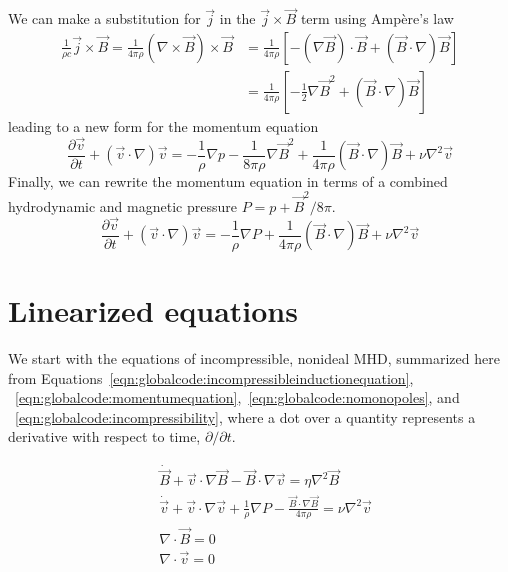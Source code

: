\documentclass[letterpaper]{article}
\begin{document}
We can make a substitution for $\vec{j}$ in the $\vec{j}\times\vec{B}$
term using Amp\`{e}re's law
\begin{align}
\frac{1}{\rho c}\vec{j}\times\vec{B} 
 = \frac{1}{4\pi \rho}\left(\nabla\times\vec{B}\right)\times\vec{B} 
 &= \frac{1}{4\pi \rho}\left[-\left(\nabla\vec{B}\right)\cdot\vec{B} 
                            +\left(\vec{B}\cdot\nabla\right)\vec{B}\right]
\nonumber \\
 &= \frac{1}{4\pi \rho}\left[-\frac{1}{2}\nabla\vec{B}^2 
                            +\left(\vec{B}\cdot\nabla\right)\vec{B}\right]
\end{align}
leading to a new form for the momentum equation
\begin{equation}
\frac{\partial \vec{v}}{\partial t} + \left(\vec{v}\cdot\nabla\right)\vec{v}
 = -\frac{1}{\rho}\nabla p - \frac{1}{8\pi\rho}\nabla\vec{B}^2
   + \frac{1}{4\pi\rho}\left(\vec{B}\cdot\nabla\right)\vec{B}
   + \nu \nabla^2 \vec{v}
\end{equation}
Finally, we can rewrite the momentum equation in terms of a combined
hydrodynamic and magnetic pressure $P=p+\vec{B}^2/8\pi$.
\begin{equation}
\frac{\partial \vec{v}}{\partial t} + \left(\vec{v}\cdot\nabla\right)\vec{v}
 = - \frac{1}{\rho}\nabla P 
   + \frac{1}{4\pi\rho}\left(\vec{B}\cdot\nabla\right)\vec{B}
   + \nu \nabla^2 \vec{v}
\label{eqn:globalcode:momentumequation}
\end{equation}

\section{Linearized equations}

We start with the equations of incompressible, nonideal MHD,
summarized here from
Equations~\ref{eqn:globalcode:incompressibleinductionequation},
~\ref{eqn:globalcode:momentumequation},~\ref{eqn:globalcode:nomonopoles},
and ~\ref{eqn:globalcode:incompressibility}, where a dot over a
quantity represents a derivative with respect to time,
$\partial/\partial t$.

\begin{align}
&\dot{\vec{B}} + \vec{v}\cdot\nabla\vec{B} - \vec{B}\cdot\nabla\vec{v}
 = \eta\nabla^2 \vec{B}
\\
&\dot{\vec{v}}+\vec{v}\cdot\nabla\vec{v}+\frac{1}{\rho}\nabla{P}
 - \frac{\vec{B}\cdot\nabla\vec{B}}{4\pi\rho}=\nu\nabla^2\vec{v}
\\
&\nabla\cdot\vec{B}=0
\\
&\nabla\cdot\vec{v}=0
\end{align}
\end{document}
